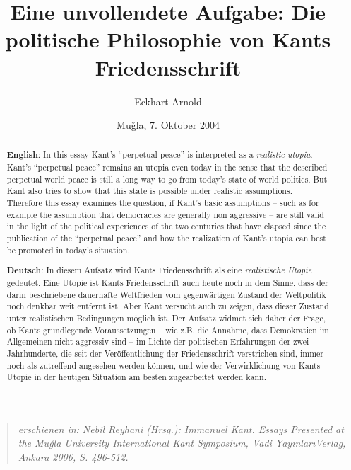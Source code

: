 \documentclass[12pt,a4paper,ngerman]{article}
\begin{document}
\title{Eine unvollendete Aufgabe: Die politische Philosophie von Kants
  Friedensschrift\\}

\author{Eckhart Arnold}
\date{Muğla, 7. Oktober 2004}
\maketitle

\begin{quote}
{\em erschienen in: Nebil Reyhani (Hrsg.): Immanuel Kant. Essays
Presented at the Mu\u{g}la University International Kant
Symposium, Vadi Yay\i nlar\i  Verlag, Ankara 2006, S. 496-512.}
\end{quote}


\begin{abstract}
  {\bf English}: In this essay Kant's ``perpetual peace'' is
  interpreted as a {\em realistic utopia}. Kant's ``perpetual peace''
  remains an utopia even today in the sense that the described
  perpetual world peace is still a long way to go from today's state of
  world politics. But Kant also tries to show that this state is
  possible under realistic assumptions. Therefore this essay examines
  the question, if Kant's basic assumptions -- such as for example the
  assumption that democracies are generally non aggressive -- are
  still valid in the light of the political experiences of the two
  centuries that have elapsed since the publication of the ``perpetual
  peace'' and how the realization of Kant's utopia can best be promoted
  in today's situation.

  {\bf Deutsch}: In diesem Aufsatz wird Kants Friedensschrift als eine {\em
    realistische Utopie} gedeutet. Eine Utopie ist Kants Friedensschrift auch
  heute noch in dem Sinne, dass der darin beschriebene dauerhafte Weltfrieden
  vom gegenwärtigen Zustand der Weltpolitik noch denkbar weit entfernt
  ist. Aber Kant versucht auch zu zeigen, dass dieser Zustand unter
  realistischen Bedingungen möglich ist. Der Aufsatz widmet sich daher der
  Frage, ob Kants grundlegende Voraussetzungen -- wie z.B. die Annahme, dass
  Demokratien im Allgemeinen nicht aggressiv sind -- im Lichte der politischen
  Erfahrungen der zwei Jahrhunderte, die seit der Veröffentlichung der
  Friedensschrift verstrichen sind, immer noch als zutreffend angesehen werden
  können, und wie der Verwirklichung von Kants Utopie in der heutigen
  Situation am besten zugearbeitet werden kann.

\end{abstract}
\end{document}
